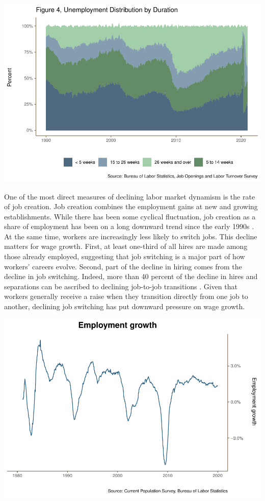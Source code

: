 \documentclass[
  11pt,
]{article}
\begin{document}
\begin{center}\includegraphics{JOLTS_files/figure-latex/unnamed-chunk-8-1} \end{center}

One of the most direct measures of declining labor market dynamism is
the rate of job creation. Job creation combines the employment gains at
new and growing establishments. While there has been some cyclical
fluctuation, job creation as a share of employment has been on a long
downward trend since the early 1990s \citep{davis14}. At the same time,
workers are increasingly less likely to switch jobs. This decline
matters for wage growth. First, at least one-third of all hires are made
among those already employed, suggesting that job switching is a major
part of how workers' careers evolve. Second, part of the decline in
hiring comes from the decline in job switching. Indeed, more than 40
percent of the decline in hires and separations can be ascribed to
declining job-to-job transitions \citep{Hyatt13}. Given that workers
generally receive a raise when they transition directly from one job to
another, declining job switching has put downward pressure on wage
growth.

\begin{center}\includegraphics{JOLTS_files/figure-latex/unnamed-chunk-9-1} \end{center}
\end{document}
